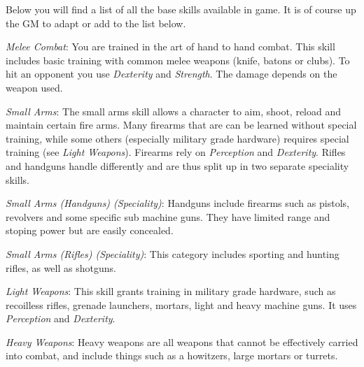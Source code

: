 Below you will find a list of all the base skills available in game. It is of
course up the GM to adapt or add to the list below.


\emph{Melee Combat}: You are trained in the art of hand to hand combat. This
skill includes basic training with common melee weapons (knife, batons or
clubs). To hit an opponent you use \emph{Dexterity} and \emph{Strength}.
The damage depends on the weapon used.

\emph{Small Arms}: The small arms skill allows a character to aim, shoot, reload
and maintain certain fire arms. Many firearms that are can be learned without
special training, while some others (especially military grade hardware)
requires special training (see \emph{Light Weapons}). Firearms rely on
\emph{Perception} and \emph{Dexterity}. Rifles and handguns handle differently
and are thus split up in two separate speciality skills.

\emph{Small Arms (Handguns) (Speciality)}: Handguns include firearms such as
pistols, revolvers and some specific sub machine guns. They have limited range
and stoping power but are easily concealed.

\emph{Small Arms (Rifles) (Speciality)}: This category includes sporting and
hunting rifles, as well as shotguns.

\emph{Light Weapons}: This skill grants training in military grade hardware,
such as recoilless rifles, grenade launchers, mortars, light and heavy machine
guns. It uses \emph{Perception} and \emph{Dexterity}.

\emph{Heavy Weapons}: Heavy weapons are all weapons that cannot be effectively
carried into combat, and include things such as a howitzers, large mortars or
turrets.
